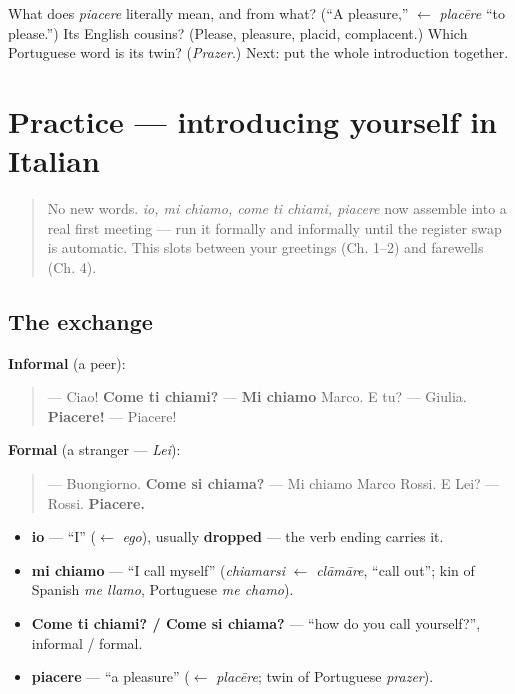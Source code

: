 \begin{tcolorbox}[breakable,colback=teal!4,colframe=teal!35!black,title={Before you move on}]
What does \emph{piacere} literally mean, and from what? (\textquotedblleft{}A pleasure,\textquotedblright{} $\leftarrow$ \emph{placēre} \textquotedblleft{}to please.\textquotedblright{}) Its English cousins? (Please, pleasure, placid, complacent.) Which Portuguese word is its twin? (\emph{Prazer}.) Next: put the whole introduction together.
\end{tcolorbox}
\section[Practice]{Practice — introducing yourself in Italian}

\label{lesson:IT-C03-practice}



\begin{quote}
No new words. \emph{io, mi chiamo, come ti chiami, piacere} now assemble into a real first meeting — run it formally and informally until the register swap is automatic. This slots between your greetings (Ch. 1–2) and farewells (Ch. 4).
\end{quote}

\subsection*{The exchange}
\textbf{Informal} (a peer):

\begin{quote}
— Ciao! \textbf{Come ti chiami?} — \textbf{Mi chiamo} Marco. E tu? — Giulia. \textbf{Piacere!} — Piacere!
\end{quote}

\textbf{Formal} (a stranger — \emph{Lei}):

\begin{quote}
— Buongiorno. \textbf{Come si chiama?} — Mi chiamo Marco Rossi. E Lei? — Rossi. \textbf{Piacere.}
\end{quote}

\begin{grammarlens}[title={What you've built this chapter}]
\begin{itemize}
\raggedright
  \item \textbf{io} — \textquotedblleft{}I\textquotedblright{} ($\leftarrow$ \emph{ego}), usually \textbf{dropped} — the verb ending carries it.
  \item \textbf{mi chiamo} — \textquotedblleft{}I call myself\textquotedblright{} (\emph{chiamarsi} $\leftarrow$ \emph{clāmāre}, \textquotedblleft{}call out\textquotedblright{}; kin of Spanish \emph{me llamo}, Portuguese \emph{me chamo}).
  \item \textbf{Come ti chiami? / Come si chiama?} — \textquotedblleft{}how do you call yourself?\textquotedblright{}, informal / formal.
  \item \textbf{piacere} — \textquotedblleft{}a pleasure\textquotedblright{} ($\leftarrow$ \emph{placēre}; twin of Portuguese \emph{prazer}).
\end{itemize}
\end{grammarlens}

